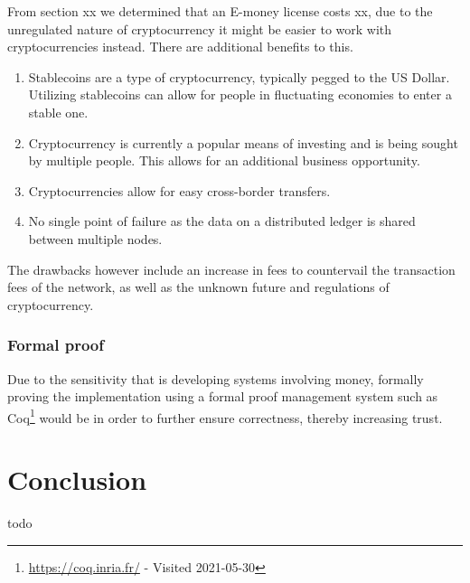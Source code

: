 \documentclass[11pt, a4paper]{article}
\begin{document}
\label{sub:blockchain_technology}

From {\color{red} section xx} we determined that an E-money license costs {\color{red} xx}, due to the unregulated nature of cryptocurrency it might be easier to work with cryptocurrencies instead. There are additional benefits to this.
\begin{enumerate}
  \item Stablecoins are a type of cryptocurrency, typically pegged to the US Dollar. Utilizing stablecoins can allow for people in fluctuating economies to enter a stable one.
  \item Cryptocurrency is currently a popular means of investing and is being sought by multiple people. This allows for an additional business opportunity.
  \item Cryptocurrencies allow for easy cross-border transfers.
  \item No single point of failure as the data on a distributed ledger is shared between multiple nodes.
\end{enumerate}
The drawbacks however include an increase in fees to countervail the transaction fees of the network, as well as the unknown future and regulations of cryptocurrency.

\subsubsection{Formal proof} %
\label{sub:formal_proof}
Due to the sensitivity that is developing systems involving money, formally proving the implementation using a formal proof management system such as Coq\footnote{\url{https://coq.inria.fr/} - Visited 2021-05-30} would be in order to further ensure correctness, thereby increasing trust.

\section{Conclusion}
{\color{red} todo}

\begingroup
\let\cleardoublepage\clearpage
{}


\endgroup
\end{document}
